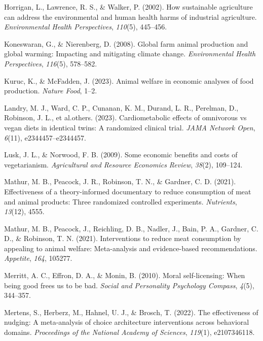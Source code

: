 \documentclass[
  man]{apa6}
\newlength{\cslhangindent}
\newenvironment{CSLReferences}[2] %
 {\begin{list}{}{%
  \setlength{\itemindent}{0pt}
  \setlength{\leftmargin}{0pt}
  \setlength{\parsep}{0pt}
  \ifodd #1
   \setlength{\leftmargin}{\cslhangindent}
   \setlength{\itemindent}{-1\cslhangindent}
  \fi
  \setlength{\itemsep}{#2\baselineskip}}}
 {\end{list}}
\begin{document}
\begin{CSLReferences}{1}{0}
Horrigan, L., Lawrence, R. S., \& Walker, P. (2002). How sustainable agriculture can address the environmental and human health harms of industrial agriculture. \emph{Environmental Health Perspectives}, \emph{110}(5), 445--456.

Koneswaran, G., \& Nierenberg, D. (2008). Global farm animal production and global warming: Impacting and mitigating climate change. \emph{Environmental Health Perspectives}, \emph{116}(5), 578--582.

Kuruc, K., \& McFadden, J. (2023). Animal welfare in economic analyses of food production. \emph{Nature Food}, 1--2.

Landry, M. J., Ward, C. P., Cunanan, K. M., Durand, L. R., Perelman, D., Robinson, J. L., et al.others. (2023). Cardiometabolic effects of omnivorous vs vegan diets in identical twins: A randomized clinical trial. \emph{JAMA Network Open}, \emph{6}(11), e2344457--e2344457.

Lusk, J. L., \& Norwood, F. B. (2009). Some economic benefits and costs of vegetarianism. \emph{Agricultural and Resource Economics Review}, \emph{38}(2), 109--124.

Mathur, M. B., Peacock, J. R., Robinson, T. N., \& Gardner, C. D. (2021). Effectiveness of a theory-informed documentary to reduce consumption of meat and animal products: Three randomized controlled experiments. \emph{Nutrients}, \emph{13}(12), 4555.

Mathur, M. B., Peacock, J., Reichling, D. B., Nadler, J., Bain, P. A., Gardner, C. D., \& Robinson, T. N. (2021). Interventions to reduce meat consumption by appealing to animal welfare: Meta-analysis and evidence-based recommendations. \emph{Appetite}, \emph{164}, 105277.

Merritt, A. C., Effron, D. A., \& Monin, B. (2010). Moral self-licensing: When being good frees us to be bad. \emph{Social and Personality Psychology Compass}, \emph{4}(5), 344--357.

Mertens, S., Herberz, M., Hahnel, U. J., \& Brosch, T. (2022). The effectiveness of nudging: A meta-analysis of choice architecture interventions across behavioral domains. \emph{Proceedings of the National Academy of Sciences}, \emph{119}(1), e2107346118.


\end{CSLReferences}
\end{document}

